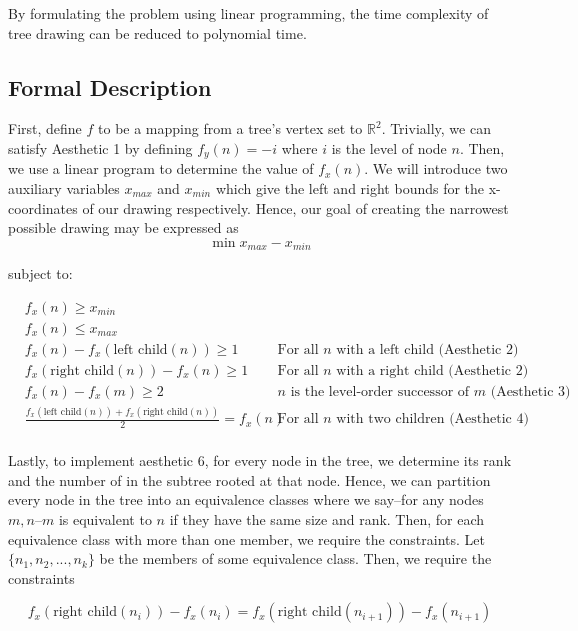 \documentclass[11pt]{report}
\newcommand{\leftc}[1]{\text{left child}\left(#1\right)}
\newcommand{\rightc}[1]{\text{right child}\left(#1\right)}
\begin{document}
\bigskip

By formulating the problem using linear programming, the time complexity of tree drawing can be reduced to polynomial time.\cite{supowit1983complexity}

\subsection{Formal Description}
First, define $f$ to be a mapping from a tree's vertex set to $\mathbb{R}^2$. Trivially, we can satisfy Aesthetic 1 by defining $f_y(n) = -i$ where $i$ is the level of node $n$. Then, we use a linear program to determine the value of $f_x(n)$. We will introduce two auxiliary variables $x_{max}$ and $x_{min}$ which give the left and right bounds for the x-coordinates of our drawing respectively. Hence, our goal of creating the narrowest possible drawing may be expressed as 
\[
\min{x_{max} - x_{min}}
\]

subject to:

\[
\begin{aligned}
    &f_x(n) \geq x_{min} \\
    &f_x(n) \leq x_{max} \\
    &f_x(n) - f_x( \leftc{n} ) \geq 1 &\text{For all $n$ with a left child (Aesthetic 2)} \\
    &f_x( \rightc{n} ) - f_x(n) \geq 1 &\text{For all $n$ with a right child (Aesthetic 2)} \\
    &f_x(n) - f_x(m) \geq 2 &\text{$n$ is the level-order successor of $m$ (Aesthetic 3)} \\
    &\frac{ f_x(\leftc{n}) + f_x(\rightc{n}) }{2} = f_x(n)
         &\text{For all $n$ with two children (Aesthetic 4)} \\
\end{aligned}
\]

Lastly, to implement aesthetic 6, for every node in the tree, we determine its rank and the number of in the subtree rooted at that node. Hence, we can partition every node in the tree into an equivalence classes where we say--for any nodes $m, n$--$m$ is equivalent to $n$ if they have the same size and rank. Then, for each equivalence class with more than one member, we require the constraints. Let $\{ n_1, n_2, ..., n_k \}$ be the members of some equivalence class. Then, we require the constraints

\begin{equation}
    f_x( \rightc{n_i} ) - f_x(n_i) = f_x( \rightc{n_{i + 1}} ) - f_x( n_{i + 1} )
\end{equation}
\end{document}

